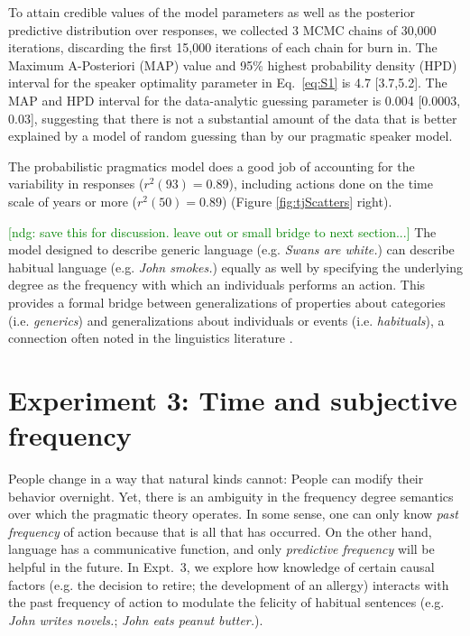 \documentclass[10pt,letterpaper]{article}
\newcommand{\ndg}[1]{\textcolor{Green}{[ndg: #1]}}
\begin{document}
To attain credible values of the model parameters as well as the posterior predictive distribution over responses, we collected 3 MCMC chains of 30,000 iterations, discarding the first 15,000 iterations of each chain for burn in.
The Maximum A-Posteriori (MAP) value and 95\% highest probability density (HPD) interval for the speaker optimality parameter in Eq.~\ref{eq:S1} is 4.7 [3.7,5.2].
The MAP and HPD interval for the data-analytic guessing parameter is 0.004 [0.0003, 0.03], suggesting that there is not a substantial amount of the data that is better explained by a model of random guessing than by our pragmatic speaker model.

The probabilistic pragmatics model does a good job of accounting for the variability in responses ($r^2(93) = 0.89$), including actions done on the time scale of years or more  ($r^2(50) = 0.89$) (Figure \ref{fig:tjScatters} right).

\ndg{save this for discussion. leave out or small bridge to next section...}
The model designed to describe generic language (e.g. \emph{Swans are white.}) can describe habitual language (e.g. \emph{John smokes.}) equally as well by specifying the underlying degree as the frequency with which an individuals performs an action.
This provides a formal bridge between generalizations of properties about categories (i.e. \emph{generics}) and generalizations about individuals or events (i.e. \emph{habituals}), a connection often noted in the linguistics literature \cite{Carlson1977, Carlson2005, Cohen1999}. 

\section{Experiment 3: Time and subjective frequency}

People change in a way that natural kinds cannot: People can modify their behavior overnight.
Yet, there is an ambiguity in the frequency degree semantics over which the pragmatic theory operates.
In some sense, one can only know \emph{past frequency} of action because that is all that has occurred.
On the other hand, language has a communicative function, and only \emph{predictive frequency} will be helpful in the future.
In Expt.~3, we explore how knowledge of certain causal factors (e.g. the decision to retire; the development of an allergy) interacts with the past frequency of action to modulate the felicity of habitual sentences (e.g. \emph{John writes novels.}; \emph{John eats peanut butter.}).
\end{document}
